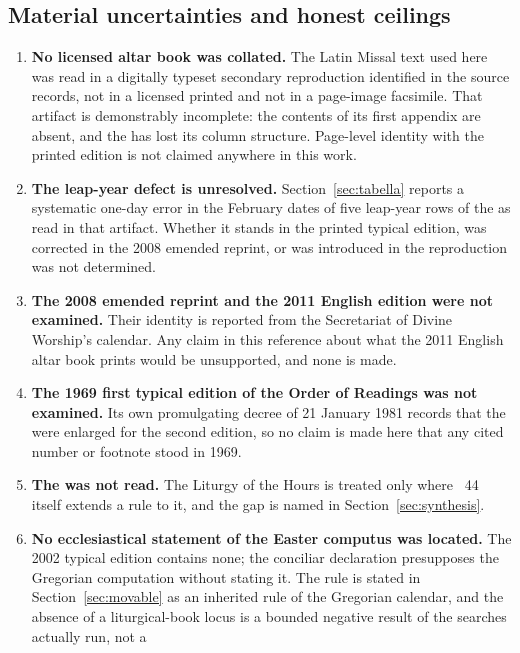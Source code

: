 \subsection{Material uncertainties and honest ceilings}

\begin{enumerate}
\item \textbf{No licensed altar book was collated.} The Latin Missal text used here was read in a
digitally typeset secondary reproduction identified in the source records, not in a licensed printed
 and not in a page-image facsimile. That artifact is demonstrably incomplete:
the contents of its first appendix are absent, and the  has lost its column
structure. Page-level identity with the printed edition is not claimed anywhere in this work.
\item \textbf{The leap-year defect is unresolved.} Section~\ref{sec:tabella} reports a systematic
one-day error in the February dates of five leap-year rows of the  as read
in that artifact. Whether it stands in the printed typical edition, was corrected in the 2008 emended
reprint, or was introduced in the reproduction was not determined.
\item \textbf{The 2008 emended reprint and the 2011 English edition were not examined.} Their
identity is reported from the Secretariat of Divine Worship's calendar. Any claim in this reference
about what the 2011 English altar book prints would be unsupported, and none is made.
\item \textbf{The 1969 first typical edition of the Order of Readings was not examined.} Its own
promulgating decree of 21 January 1981 records that the  were enlarged for the
second edition, so no claim is made here that any cited number or footnote stood in 1969.
\item \textbf{The  was not read.} The Liturgy of the
Hours is treated only where ~44 itself extends a rule to it, and the gap is named in
Section~\ref{sec:synthesis}.
\item \textbf{No ecclesiastical statement of the Easter computus was located.} The 2002 typical
edition contains none; the conciliar declaration presupposes the Gregorian computation without
stating it. The rule is stated in Section~\ref{sec:movable} as an inherited rule of the Gregorian calendar, and the
absence of a liturgical-book locus is a bounded negative result of the searches actually run, not a

\end{enumerate}
